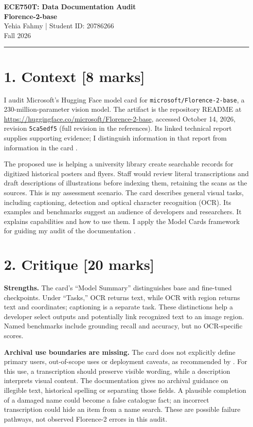 \documentclass[11pt,letterpaper]{article}
\begin{document}
{\Large\textbf{ECE750T: Data Documentation Audit}}\\[5pt]
{\large\textbf{Florence-2-base}}\\[4pt]
Yehia Fahmy \quad | \quad Student ID: 20786266\\
Fall 2026
\vspace{0.5em}\hrule\vspace{0.5em}

\section*{1. Context [8 marks]}
I audit Microsoft's Hugging Face model card for \texttt{microsoft/Florence-2-base}, a 230-million-parameter vision model. The artifact is the repository README at \url{https://huggingface.co/microsoft/Florence-2-base}, accessed October 14, 2026, revision \texttt{5ca5edf5} (full revision in the references). Its linked technical report supplies supporting evidence; I distinguish information in that report from information in the card \citep{microsoftCard,xiao2023}.

The proposed use is helping a university library create searchable records for digitized historical posters and flyers. Staff would review literal transcriptions and draft descriptions of illustrations before indexing them, retaining the scans as the sources. This is my assessment scenario. The card describes general visual tasks, including captioning, detection and optical character recognition (OCR). Its examples and benchmarks suggest an audience of developers and researchers. It explains capabilities and how to use them. I apply the Model Cards framework for guiding my audit of the documentation \citep{mitchell2019}.

\section*{2. Critique [20 marks]}
\textbf{Strengths.} The card's ``Model Summary'' distinguishes base and fine-tuned checkpoints. Under ``Tasks,'' OCR returns text, while OCR with region returns text and coordinates; captioning is a separate task. These distinctions help a developer select outputs and potentially link recognized text to an image region. Named benchmarks include grounding recall and accuracy, but no OCR-specific scores.

\textbf{Archival use boundaries are missing.} The card does not explicitly define primary users, out-of-scope uses or deployment caveats, as recommended by \citet[\S\S4.2, 4.8--4.9]{mitchell2019}. For this use, a transcription should preserve visible wording, while a description interprets visual content. The documentation gives no archival guidance on illegible text, historical spelling or separating those fields. A plausible completion of a damaged name could become a false catalogue fact; an incorrect transcription could hide an item from a name search. These are possible failure pathways, not observed Florence-2 errors in this audit.
\end{document}
